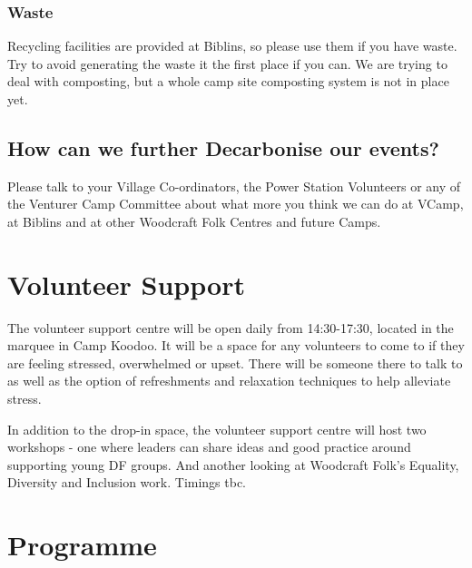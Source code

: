 \documentclass[a4paper, 11pt]{report}
\begin{document}
\subsection{Waste}
Recycling facilities are provided at Biblins, so please use them if you have waste. Try to avoid generating the waste it the first place if you can. We are trying to deal with composting, but a whole camp site composting system is not in place yet.

\section{How can we further Decarbonise our events?}
Please talk to your Village Co-ordinators, the Power Station Volunteers or any of the Venturer Camp Committee about what more you think we can do at VCamp, at Biblins and at other Woodcraft Folk Centres and future Camps.

\chapter{Volunteer Support}
The volunteer support centre will be open daily from 14:30-17:30, located in the marquee in Camp Koodoo. It will be a space for any volunteers to come to if they are feeling stressed, overwhelmed or upset. There will be someone  there to talk to as well as the option of refreshments and relaxation techniques to help alleviate stress. \nl

In addition to the drop-in space, the volunteer support centre will host two workshops - one where leaders can share ideas and good practice around supporting young DF groups. And another looking at Woodcraft Folk's Equality, Diversity and Inclusion work. Timings tbc.

\chapter{Programme}
\end{document}
